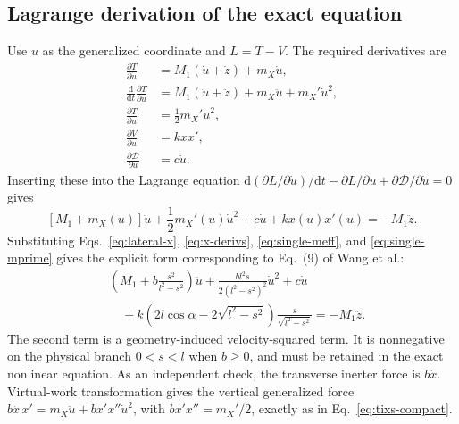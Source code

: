 \documentclass[a4paper,12pt]{article}
\numberwithin{equation}{section}
\newcommand{\dd}{\mathrm d}
\begin{document}
\subsection{Lagrange derivation of the exact equation}
Use $u$ as the generalized coordinate and $L=T-V$. The required derivatives are
\begin{align}
\frac{\partial T}{\partial\dot u}
 &=M_1(\dot u+\dot z)+m_X\dot u,\\
\frac{\dd}{\dd t}\frac{\partial T}{\partial\dot u}
 &=M_1(\ddot u+\ddot z)+m_X\ddot u+m_X'\dot u^2,\\
\frac{\partial T}{\partial u}
 &=\frac12m_X'\dot u^2,\\
\frac{\partial V}{\partial u}
 &=kxx',\\
\frac{\partial\mathcal D}{\partial\dot u}
 &=c\dot u.
\end{align}
Inserting these into the Lagrange equation
$\dd(\partial L/\partial\dot u)/\dd t-\partial L/\partial u
+\partial\mathcal D/\partial\dot u=0$ gives
\begin{equation}
 \boxed{[M_1+m_X(u)]\ddot u
 +\frac12m_X'(u)\dot u^2+c\dot u+kx(u)x'(u)
 =-M_1\ddot z.}
 \label{eq:tixs-compact}
\end{equation}
Substituting Eqs.~\eqref{eq:lateral-x}, \eqref{eq:x-derivs},
\eqref{eq:single-meff}, and \eqref{eq:single-mprime} gives the explicit form corresponding to Eq.~(9) of Wang et al.:
\begin{equation}
 \boxed{\begin{aligned}
 &\left(M_1+b\frac{s^2}{l^2-s^2}\right)\ddot u
 +\frac{bl^2s}{2(l^2-s^2)^2}\dot u^2+c\dot u\\
 &\quad+k\left(2l\cos\alpha-2\sqrt{l^2-s^2}\right)
       \frac{s}{\sqrt{l^2-s^2}}
 =-M_1\ddot z.
 \end{aligned}}
 \label{eq:tixs-full}
\end{equation}
The second term is a geometry-induced velocity-squared term. It is nonnegative on the physical branch $0<s<l$ when $b\geq0$, and must be retained in the exact nonlinear equation. As an independent check, the transverse inerter force is $b\ddot x$. Virtual-work transformation gives the vertical generalized force
$b\ddot x\,x'=m_X\ddot u+bx'x''\dot u^2$, with $bx'x''=m_X'/2$, exactly as in Eq.~\eqref{eq:tixs-compact}.
\end{document}
